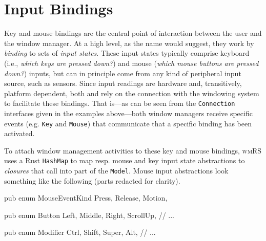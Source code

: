 \section{Input Bindings}


Key and mouse bindings are the central point of interaction between the user and
the window  manager. At a high  level, as the  name would suggest, they  work by
\textit{binding} to sets of \textit{input  states}. These input states typically
comprise  keyboard  (i.e., \textit{which  keys  are  pressed down?})  and  mouse
(\textit{which mouse  buttons are pressed  down?}) inputs, but can  in principle
come from  any kind  of peripheral  input source, such  as sensors.  Since input
readings  are hardware  and, transitively,  platform dependent,  both \wmrs  and
\wmcpp rely  on the  connection with  the windowing  system to  facilitate these
bindings. That is---as can be seen from the \texttt{Connection} interfaces given
in  the examples  above---both  window managers  receive  specific events  (e.g.
\texttt{Key} and  \texttt{Mouse}) that communicate  that a specific  binding has
been activated.

To  attach  window  management  activities  to these  key  and  mouse  bindings,
\textsc{wmRS} uses a Rust \texttt{HashMap}  to map resp. mouse and key
input  state  abstractions to  \textit{closures}  that  call  into part  of  the
\texttt{Model}.  Mouse  input abstractions  look  something  like the  following
(parts redacted for clarity).

\begin{rustblock}
  pub enum MouseEventKind {
    Press, Release, Motion,
  }
\end{rustblock}

\vspace{0.15cm}
\begin{minipage}{0.45\linewidth}
\begin{rustblock}
pub enum Button {
  Left,
  Middle,
  Right,
  ScrollUp,
  // ...
}
\end{rustblock}
\end{minipage}
\begin{minipage}{0.50\linewidth}
\begin{rustblock}
pub enum Modifier {
  Ctrl,
  Shift,
  Super,
  Alt,
  // ...
}
\end{rustblock}
\end{minipage}\\

